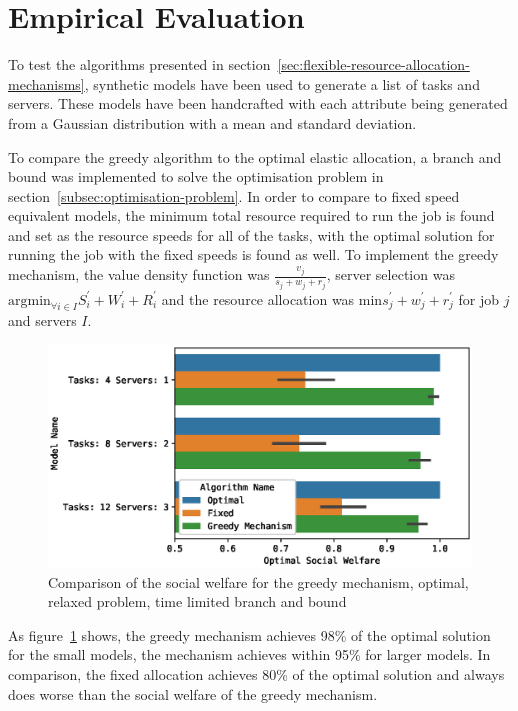 \section{Empirical Evaluation}\label{sec:empirical-evaluation}
To test the algorithms presented in section~\ref{sec:flexible-resource-allocation-mechanisms}, synthetic models have
been used to generate a list of tasks and servers. These models have been handcrafted with each attribute being
generated from a Gaussian distribution with a mean and standard deviation.

To compare the greedy algorithm to the optimal elastic allocation, a branch and bound was implemented to solve the
optimisation problem in section~\ref{subsec:optimisation-problem}. In order to compare to fixed speed equivalent models,
the minimum total resource required to run the job is found and set as the resource speeds for all of the tasks, with
the optimal solution for running the job with the fixed speeds is found as well. To implement the greedy mechanism, the
value density function was $\frac{v_j}{s_j + w_j + r_j}$, server selection was
$\text{argmin}_{\forall i \in I} S^{'}_i + W^{'}_i + R^{'}_i$ and the resource allocation was
$\text{min} s^{'}_j + w^{'}_j + r^{'}_j$ for job $j$ and servers $I$.

\begin{figure}[h]
    \centering
    \includegraphics[width=\linewidth]{fig/empirical_evidence/greedy_mechanism.eps}
    \caption{Comparison of the social welfare for the greedy mechanism, optimal, relaxed problem, time limited branch and bound}
    \label{fig:greedy_mechanism_comparison}
\end{figure}
As figure~\ref{fig:greedy_mechanism_comparison} shows, the greedy mechanism achieves 98\% of the optimal solution for
the small models, the mechanism achieves within 95\% for larger models. In comparison, the fixed allocation achieves
80\% of the optimal solution and always does worse than the social welfare of the greedy mechanism.

